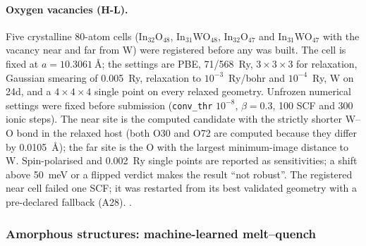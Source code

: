\paragraph{Oxygen vacancies (H-L).} Five crystalline 80-atom cells (In$_{32}$O$_{48}$, In$_{31}$WO$_{48}$,
In$_{32}$O$_{47}$ and In$_{31}$WO$_{47}$ with the vacancy near and far from W) were registered before any was
built. %
The cell is fixed at $a = \SI{10.3061}{\angstrom}$; the settings are PBE, 71/568~Ry, $3\times3\times3$ for relaxation,
Gaussian smearing of 0.005~Ry, relaxation to $10^{-3}$~Ry/bohr and $10^{-4}$~Ry, W on 24d, and a
$4\times4\times4$ single point on every relaxed geometry. %
Unfrozen numerical settings were fixed before submission (\texttt{conv\_thr} $10^{-8}$, $\beta = 0.3$, 100 SCF and
300 ionic steps). %
The near site is the computed candidate with the strictly shorter W--O bond in the relaxed host (both O30 and O72 are
computed because they differ by \SI{0.0105}{\angstrom}); the far site is the O with the largest minimum-image distance
to W. %
Spin-polarised and 0.002~Ry single points are reported as sensitivities; a shift above 50~meV or a flipped verdict
makes the result ``not robust''. %
The registered near cell failed one SCF; it was restarted from its best validated geometry with a pre-declared
fallback (A28). %
.

\subsubsection{Amorphous structures: machine-learned melt--quench}
\label{sec:m-dft-mace}

